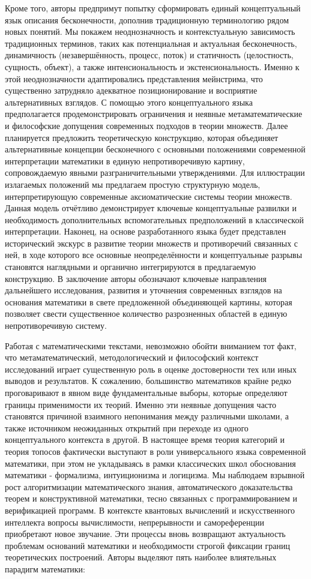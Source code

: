 \documentclass[12pt]{article}
\begin{document}
Кроме того, авторы предпримут попытку сформировать единый концептуальный язык описания бесконечности, дополнив традиционную терминологию рядом новых понятий. Мы покажем неоднозначность и контекстуальную зависимость традиционных терминов, таких как потенциальная и актуальная бесконечность, динамичность (незавершённость, процесс, поток) и статичность (целостность, сущность, объект), а также интенсиональность и экстенсиональность. Именно к этой неоднозначности адаптировались представления мейнстрима, что существенно затрудняло адекватное позиционирование и восприятие альтернативных взглядов. С помощью этого концептуального языка предполагается продемонстрировать ограничения и неявные метаматематические и философские допущения современных подходов в теории множеств. Далее планируется предложить теоретическую конструкцию, которая объединяет альтернативные концепции бесконечного с основными положениями современной интерпретации математики в единую непротиворечивую картину, сопровождаемую явными разграничительными утверждениями. Для иллюстрации излагаемых положений мы предлагаем простую структурную модель, интерпретирующую современные аксиоматические системы теории множеств. Данная модель отчётливо демонстрирует ключевые концептуальные развилки и необходимость дополнительных вспомогательных предположений в классической интерпретации. Наконец, на основе разработанного языка будет представлен исторический экскурс в развитие теории множеств и противоречий связанных с ней, в ходе которого все основные неопределённости и концептуальные разрывы становятся наглядными и органично интегрируются в предлагаемую конструкцию. В заключение авторы обозначают ключевые направления дальнейшего исследования, развития и уточнения современных взглядов на основания математики в свете предложенной объединяющей картины, которая позволяет свести существенное количество разрозненных областей в единую непротиворечивую систему.

Работая с математическими текстами, невозможно обойти вниманием тот факт, что метаматематический, методологический и философский контекст исследований играет существенную роль в оценке достоверности тех или иных выводов и результатов. К сожалению, большинство математиков крайне редко проговаривают в явном виде фундаментальные выборы, которые определяют границы применимости их теорий. Именно эти неявные допущения часто становятся причиной взаимного непонимания между различными школами, а также источником неожиданных открытий при переходе из одного концептуального контекста в другой. В настоящее время теория категорий и теория топосов фактически выступают в роли универсального языка современной математики, при этом не укладываясь в рамки классических школ обоснования математики - формализма, интуиционизма и логицизма. Мы наблюдаем взрывной рост алгоритмизации математического знания, автоматического доказательства теорем и конструктивной математики, тесно связанных с программированием и верификацией программ. В контексте квантовых вычислений и искусственного интеллекта вопросы вычислимости, непрерывности и самореференции приобретают новое звучание. Эти процессы вновь возвращают актуальность проблемам оснований математики и необходимости строгой фиксации границ теоретических построений. Авторы выделяют пять наиболее влиятельных парадигм математики:
\end{document}
